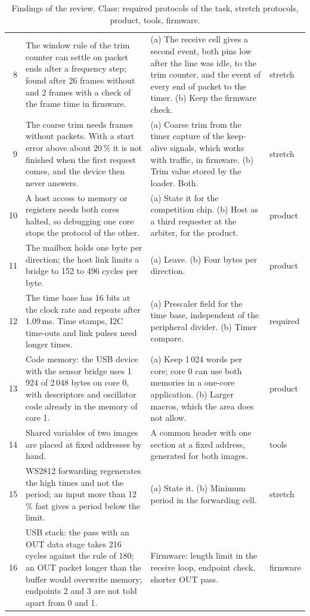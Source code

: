 \documentclass[10pt,a4paper]{article}
\begin{document}
\begin{table}[H]
\begin{tabularx}{\linewidth}{@{}rLLl@{}}
8 & The window rule of the trim counter can settle on packet ends after a frequency step; found after 26 frames without and 2 frames with a check of the frame time in firmware. & (a) The receive cell gives a second event, both pins low after the line was idle, to the trim counter, and the event of every end of packet to the timer. (b) Keep the firmware check. & stretch \\
9 & The coarse trim needs frames without packets. With a start error above about 20\,\% it is not finished when the first request comes, and the device then never answers. & (a) Coarse trim from the timer capture of the keep-alive signals, which works with traffic, in firmware. (b) Trim value stored by the loader. Both. & stretch \\
10 & A host access to memory or registers needs both cores halted, so debugging one core stops the protocol of the other. & (a) State it for the competition chip. (b) Host as a third requester at the arbiter, for the product. & product \\
11 & The mailbox holds one byte per direction; the host link limits a bridge to 152 to 496 cycles per byte. & (a) Leave. (b) Four bytes per direction. & product \\
12 & The time base has 16 bits at the clock rate and repeats after 1.09\,ms. Time stamps, I2C time-outs and link pulses need longer times. & (a) Prescaler field for the time base, independent of the peripheral divider. (b) Timer compare. & required \\
13 & Code memory: the USB device with the sensor bridge uses 1\,924 of 2\,048 bytes on core 0, with descriptors and oscillator code already in the memory of core 1. & (a) Keep 1\,024 words per core; core 0 can use both memories in a one-core application. (b) Larger macros, which the area does not allow. & product \\
14 & Shared variables of two images are placed at fixed addresses by hand. & A common header with one section at a fixed address, generated for both images. & tools \\
15 & WS2812 forwarding regenerates the high times and not the period; an input more than 12\,\% fast gives a period below the limit. & (a) State it. (b) Minimum period in the forwarding cell. & stretch \\
16 & USB stack: the pass with an OUT data stage takes 216 cycles against the rule of 180; an OUT packet longer than the buffer would overwrite memory; endpoints 2 and 3 are not told apart from 0 and 1. & Firmware: length limit in the receive loop, endpoint check, shorter OUT pass. & firmware \\
\bottomrule
\end{tabularx}
\caption{Findings of the review. Class: required protocols of the task, stretch protocols, product, tools, firmware.}
\end{table}
\end{document}
